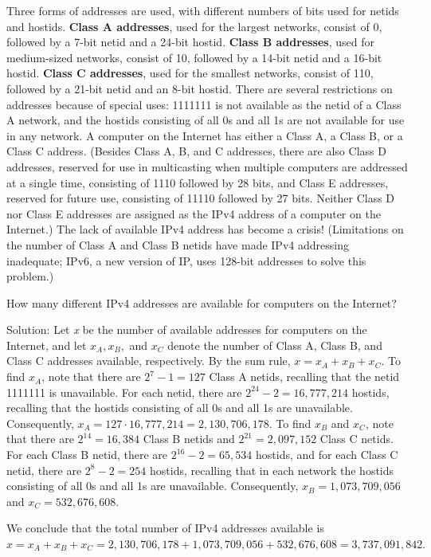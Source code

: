 \documentclass[11pt,a4paper]{book}
\begin{document}
\begin{enumerate}[label=Example~\arabic*]
Three forms of addresses are used, with different numbers of bits used for netids and hostids.
\textbf{Class A addresses}, used for the largest networks, consist of 0, followed by a 7-bit netid and a 24-bit hostid.
\textbf{Class B addresses}, used for medium-sized networks, consist of 10, followed by a 14-bit netid and a 16-bit hostid.
\textbf{Class C addresses}, used for the smallest networks, consist of 110, followed by a 21-bit netid and an 8-bit hostid.
There are several restrictions on addresses because of special uses: 1111111 is not available as the netid of a Class A network, and the hostids consisting of all 0s and all 1s are not available for use in any network.
A computer on the Internet has either a Class A, a Class B, or a Class C address.
(Besides Class A, B, and C addresses, there are also Class D addresses, reserved for use in multicasting when multiple computers are addressed at a single time, consisting of 1110 followed by 28 bits, and Class E addresses, reserved for future use, consisting of 11110 followed by 27 bits.
Neither Class D nor Class E addresses are assigned as the IPv4 address of a computer on the Internet.)
The lack of available IPv4 address has become a crisis!
(Limitations on the number of Class A and Class B netids have made IPv4 addressing inadequate; IPv6, a new version of IP, uses 128-bit addresses to
solve this problem.)

How many different IPv4 addresses are available for computers on the Internet?

Solution: Let \textit{x} be the number of available addresses for computers on the Internet, and let $x_A, x_B,$ and $x_C$ denote the number of Class A, Class B, and Class C addresses available, respectively.
By the sum rule, $x = x_A + x_B + x_C$.
To find $x_A$, note that there are $2^{7} - 1 = 127$ Class A netids, recalling that the netid 1111111 is unavailable.
For each netid, there are $2^{24} - 2 = 16,777,214$ hostids, recalling that the hostids consisting of all 0s and all 1s are unavailable.
Consequently, $x_A = 127 \cdot 16,777,214 = 2,130,706,178.$
To find $x_B$ and $x_C$, note that there are $2^{14} = 16,384$ Class B netids and $2^{21} = 2,097,152$ Class C netids.
For each Class B netid, there are $2^{16} - 2 = 65,534$ hostids, and for each Class C netid, there are $2^{8} - 2 = 254$ hostids, recalling that in each network the hostids consisting of all 0s and all 1s are unavailable.
Consequently, $x_B = 1,073,709,056$ and $x_C =532,676,608$.

We conclude that the total number of IPv4 addresses available is $x = x_A + x_B + x_C = 2,130,706,178 + 1,073,709,056 + 532,676,608 = 3,737,091,842.$


\end{enumerate}
\end{document}
